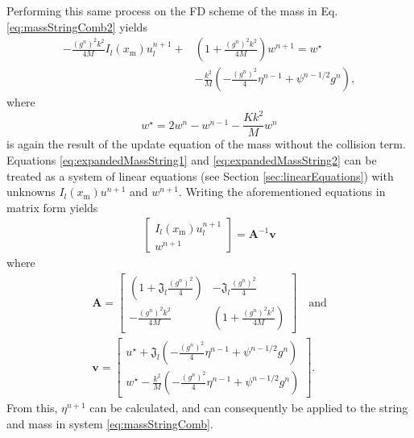 Performing this same process on the FD scheme of the mass in Eq. \eqref{eq:massStringComb2} yields
\begin{equation}\label{eq:expandedMassString2}
    \begin{aligned}
    -\frac{(g^n)^2 k^2}{4M} I_l(x_\text{m})u_l^{n+1} + &\left(1 + \frac{(g^n)^2 k^2}{4M}\right)w^{n+1} = w^\star\\
    & - \frac{k^2}{M} \left(-\frac{(g^n)^2}{4}\eta^{n-1} + \psi^{n-1/2}g^n\right),
    \end{aligned}
\end{equation}
where 
\begin{equation*}
    w^\star = 2w^n - w^{n-1} - \frac{Kk^2}{M}w^n
\end{equation*}
is again the result of the update equation of the mass without the collision term.
Equations \eqref{eq:expandedMassString1} and \eqref{eq:expandedMassString2} can be treated as a system of linear equations (see Section \ref{sec:linearEquations}) with unknowns $I_l(x_\text{m})u^{n+1}$ and $w^{n+1}$. Writing the aforementioned equations in matrix form yields
\begin{align}
    \begin{bmatrix}
            I_l(x_\text{m})u^{n+1}_l\\
            w^{n+1}
        \end{bmatrix}
        = 
        \mathbf{A}^{-1}\mathbf{v}
    \end{align}
    where
    \begin{equation}
    \begin{gathered}
    \mathbf{A} = 
        \begin{bmatrix}
            \left(1 + \mathfrak{J}_l\frac{(g^n)^2}{4}\right) & -\mathfrak{J}_l\frac{(g^n)^2}{4}\\
            -\frac{(g^n)^2 k^2}{4M} &\left(1 + \frac{(g^n)^2 k^2}{4M}\right)
        \end{bmatrix}
        \quad \text{and}\\
        \mathbf{v} = 
        \begin{bmatrix}
            u^\star + \mathfrak{J}_l \left(-\frac{(g^n)^2}{4}\eta^{n-1} + \psi^{n-1/2}g^n\right)\\
            w^\star- \frac{k^2}{M} \left(-\frac{(g^n)^2}{4}\eta^{n-1} + \psi^{n-1/2}g^n\right)
        \end{bmatrix}.
        \nonumber
    \end{gathered}
\end{equation}
From this, $\eta^{n+1}$ can be calculated, and can consequently be applied to the string and mass in system \eqref{eq:massStringComb}.

